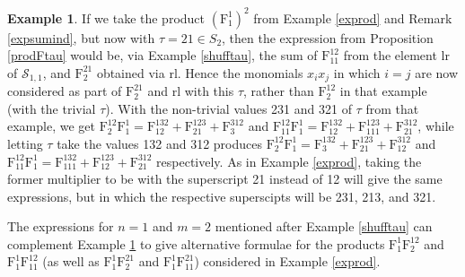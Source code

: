 \documentclass{article}
\theoremstyle{definition}
\newtheorem{ex}[thm]{Example}
\begin{document}
\begin{ex}
If we take the product $(\mathrm{F}_{1}^{1})^{2}$ from Example \ref{exprod} and Remark \ref{expsumind}, but now with $\tau=21 \in S_{2}$, then the expression from Proposition \ref{prodFtau} would be, via Example \ref{shufftau}, the sum of $\mathrm{F}_{11}^{12}$ from the element lr of $\mathcal{S}_{1,1}$, and $\mathrm{F}_{2}^{21}$ obtained via rl. Hence the monomials $x_{i}x_{j}$ in which $i=j$ are now considered as part of $\mathrm{F}_{2}^{21}$ and rl with this $\tau$, rather than $\mathrm{F}_{2}^{12}$ in that example (with the trivial $\tau$). With the non-trivial values 231 and 321 of $\tau$ from that example, we get $\mathrm{F}_{2}^{12}\mathrm{F}_{1}^{1}=\mathrm{F}_{12}^{132}+\mathrm{F}_{21}^{123}+\mathrm{F}_{3}^{312}$ and $\mathrm{F}_{11}^{12}\mathrm{F}_{1}^{1}=\mathrm{F}_{12}^{132}+\mathrm{F}_{111}^{123}+\mathrm{F}_{21}^{312}$, while letting $\tau$ take the values 132 and 312 produces $\mathrm{F}_{2}^{12}\mathrm{F}_{1}^{1}=\mathrm{F}_{3}^{132}+\mathrm{F}_{21}^{123}+\mathrm{F}_{12}^{312}$ and $\mathrm{F}_{11}^{12}\mathrm{F}_{1}^{1}=\mathrm{F}_{111}^{132}+\mathrm{F}_{12}^{123}+\mathrm{F}_{21}^{312}$ respectively. As in Example \ref{exprod}, taking the former multiplier to be with the superscript 21 instead of 12 will give the same expressions, but in which the respective superscipts will be 231, 213, and 321. \label{altprod}
\end{ex}
The expressions for $n=1$ and $m=2$ mentioned after Example \ref{shufftau} can complement Example \ref{altprod} to give alternative formulae for the products $\mathrm{F}_{1}^{1}\mathrm{F}_{2}^{12}$ and $\mathrm{F}_{1}^{1}\mathrm{F}_{11}^{12}$ (as well as $\mathrm{F}_{1}^{1}\mathrm{F}_{2}^{21}$ and $\mathrm{F}_{1}^{1}\mathrm{F}_{11}^{21}$) considered in Example \ref{exprod}.
\end{document}
